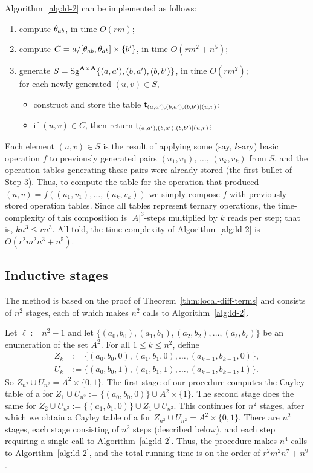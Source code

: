 \documentclass{ws-ijac}
\begin{document}
Algorithm~\ref{alg:ld-2} can be implemented as follows:
\begin{enumerate}
  \item compute $\theta_{ab}$, in time $O(rm)$;
  \item compute $C= a/[ \theta_{ab} ,  \theta_{ab} ] \times \{b'\}$,
  in time $O(rm^2 + n^5)$;
  \item generate $S=\operatorname{Sg}^{\mathbf{A}\times \mathbf{A}} \{(a,a'),(b,a'),(b,b')\}$,
    in time $O(r m^2)$;\\
    for each newly generated $(u,v) \in S$,
  \begin{itemize}
    \item construct and store the table
      $\mathsf{t}_{(a,a'),(b,a'),(b,b') |(u,v)}$;
    \item if $(u,v) \in C$, then return $\mathsf{t}_{(a,a'),(b,a'),(b,b') |(u,v)}$;
  \end{itemize}
\end{enumerate}

Each element $(u,v)\in S$ is the result of applying some (say, $k$-ary)
basic operation $f$ to previously generated pairs $(u_1, v_1)$, $\dots$, $(u_k,v_k)$
from $S$, and the operation tables generating these pairs were
already stored (the first bullet of Step 3).  Thus, to compute the table
for the operation that produced $(u,v) = f((u_1,v_1),\dots, (u_k,v_k))$
we simply compose $f$ with previously stored operation tables.
Since all tables represent ternary operations, the time-complexity of this composition
is $|A|^3$-steps multiplied by $k$ reads per step; that is,
$kn^3 \leq rn^3$.
All told, the time-complexity of Algorithm~\ref{alg:ld-2} is %
$O(r^2m^2n^3 + n^5)$.



\subsection{Inductive stages}
The method is based on the proof of Theorem~\ref{thm:local-diff-terms} and consists of $n^2$
stages, each of which makes $n^2$ calls to Algorithm~\ref{alg:ld-2}.

\renewcommand{\l}{\ensuremath{\ell}}
Let $\l := n^2 -1$ and let $\{(a_0, b_0), (a_1, b_1), (a_2, b_2), \dots, (a_{\ell}, b_{\ell})\}$
be an enumeration of the set $A^2$.
For all $1\leq k \leq n^2$, define
\begin{align*}
  Z_k &:= \{(a_0, b_0,0),(a_1, b_1,0), \dots, (a_{k-1}, b_{k-1},0)\},\\
  U_k &:= \{(a_0, b_0,1),(a_1, b_1,1), \dots, (a_{k-1}, b_{k-1},1)\}.
\end{align*}
So $Z_{n^2} \cup U_{n^2} = A^2 \times \{0,1\}$.
The first stage of our procedure computes the Cayley table of a \ldto for
$Z_1 \cup U_{n^2}:= \{(a_0, b_0, 0)\} \cup A^2 \times \{1\}$.
The second stage does the same for
$Z_2 \cup U_{n^2} := \{(a_1, b_1, 0) \} \cup Z_1 \cup U_{n^2}$.
This continues for $n^2$ stages, after which we obtain a Cayley table of a \ldto for
$Z_{n^2} \cup U_{n^2} = A^2 \times \{0,1\}$.
There are $n^2$ stages, each stage consisting of $n^2$ steps (described below),
and each step requiring a single call to Algorithm~\ref{alg:ld-2}.
Thus, the procedure makes $n^4$ calls to Algorithm~\ref{alg:ld-2}, and
the total running-time is on the order of $r^2m^2n^7 + n^9$.
\end{document}
